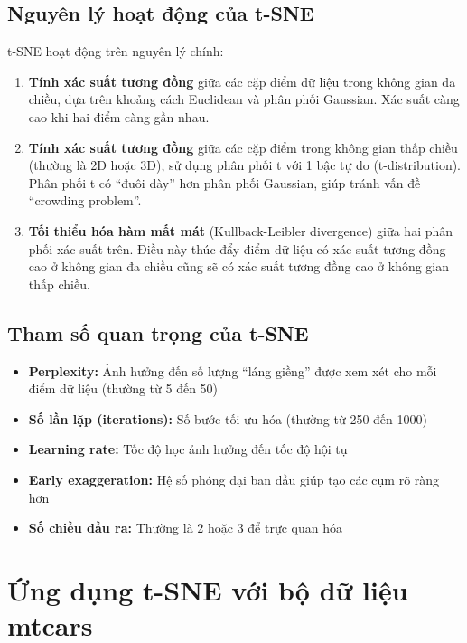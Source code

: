 \documentclass[
]{article}
\begin{document}
\subsection{Nguyên lý hoạt động của
t-SNE}\label{nguyuxean-luxfd-houx1ea1t-ux111ux1ed9ng-cux1ee7a-t-sne}

t-SNE hoạt động trên nguyên lý chính:

\begin{enumerate}
\def\labelenumi{\arabic{enumi}.}
\item
  \textbf{Tính xác suất tương đồng} giữa các cặp điểm dữ liệu trong
  không gian đa chiều, dựa trên khoảng cách Euclidean và phân phối
  Gaussian. Xác suất càng cao khi hai điểm càng gần nhau.
\item
  \textbf{Tính xác suất tương đồng} giữa các cặp điểm trong không gian
  thấp chiều (thường là 2D hoặc 3D), sử dụng phân phối t với 1 bậc tự do
  (t-distribution). Phân phối t có ``đuôi dày'' hơn phân phối Gaussian,
  giúp tránh vấn đề ``crowding problem''.
\item
  \textbf{Tối thiểu hóa hàm mất mát} (Kullback-Leibler divergence) giữa
  hai phân phối xác suất trên. Điều này thúc đẩy điểm dữ liệu có xác
  suất tương đồng cao ở không gian đa chiều cũng sẽ có xác suất tương
  đồng cao ở không gian thấp chiều.
\end{enumerate}

\subsection{Tham số quan trọng của
t-SNE}\label{tham-sux1ed1-quan-trux1ecdng-cux1ee7a-t-sne}

\begin{itemize}
\item
  \textbf{Perplexity:} Ảnh hưởng đến số lượng ``láng giềng'' được xem
  xét cho mỗi điểm dữ liệu (thường từ 5 đến 50)
\item
  \textbf{Số lần lặp (iterations):} Số bước tối ưu hóa (thường từ 250
  đến 1000)
\item
  \textbf{Learning rate:} Tốc độ học ảnh hưởng đến tốc độ hội tụ
\item
  \textbf{Early exaggeration:} Hệ số phóng đại ban đầu giúp tạo các cụm
  rõ ràng hơn
\item
  \textbf{Số chiều đầu ra:} Thường là 2 hoặc 3 để trực quan hóa
\end{itemize}

\section{Ứng dụng t-SNE với bộ dữ liệu
mtcars}\label{ux1ee9ng-dux1ee5ng-t-sne-vux1edbi-bux1ed9-dux1eef-liux1ec7u-mtcars}
\end{document}
